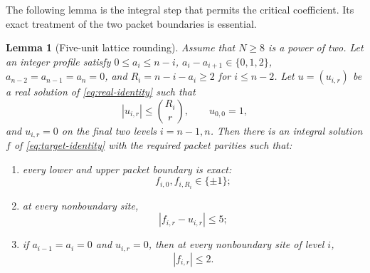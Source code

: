 \documentclass[11pt]{article}
\newtheorem{lemma}[theorem]{Lemma}
\theoremstyle{definition}
\theoremstyle{remark}
\begin{document}
The following lemma is the integral step that permits the critical coefficient.  Its exact treatment of the two packet boundaries is essential.

\begin{lemma}[Five-unit lattice rounding]\label{lem:lattice-rounding}
Assume that $N\ge8$ is a power of two. Let an integer profile satisfy
$0\le a_i\le n-i$, $a_i-a_{i+1}\in\{0,1,2\}$,
$a_{n-2}=a_{n-1}=a_n=0$, and $R_i=n-i-a_i\ge2$ for $i\le n-2$.
Let $u=(u_{i,r})$ be a real solution of \eqref{eq:real-identity} such that
\begin{equation}\label{eq:u-box}
 |u_{i,r}|\le\binom{R_i}{r},
 \qquad
 u_{0,0}=1,
\end{equation}
and $u_{i,r}=0$ on the final two levels $i=n-1,n$.  Then there is an integral solution $f$ of \eqref{eq:target-identity} with the required packet parities such that:
\begin{enumerate}[label=\textup{(\roman*)}]
\item every lower and upper packet boundary is exact:
\begin{equation}\label{eq:boundary-exact}
 f_{i,0},f_{i,R_i}\in\{\pm1\};
\end{equation}
\item at every nonboundary site,
\begin{equation}\label{eq:five-error}
 |f_{i,r}-u_{i,r}|\le5;
\end{equation}
\item if $a_{i-1}=a_i=0$ and $u_{i,r}=0$, then at every nonboundary site of level $i$,
\begin{equation}\label{eq:tail-error}
 |f_{i,r}|\le2.
\end{equation}
\end{enumerate}
\end{lemma}
\end{document}
